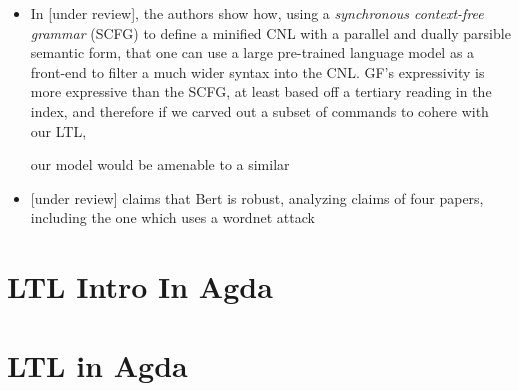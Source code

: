 \documentclass[a4paper, 11pt]{article}
\begin{document}
\begin{itemize}

\item In \cite{fewShotSem} [under review], the authors show how, using a \emph{synchronous
context-free grammar} (SCFG) to define a minified CNL with a parallel and dually
parsible semantic form, that one can use a large pre-trained language model as a front-end
to filter a much wider syntax into the CNL. GF's expressivity is
more expressive than the SCFG, at least based off a tertiary reading in the
index, and therefore if we carved out a subset of commands to cohere with our
LTL,

our model would be amenable to a similar

\item  \cite{hauser2021bert} [under review] claims that Bert is robust, analyzing claims of four
  papers, including the one which uses a wordnet attack

\end{itemize}

\section{LTL Intro In Agda}
\section{LTL in Agda}
\end{document}

